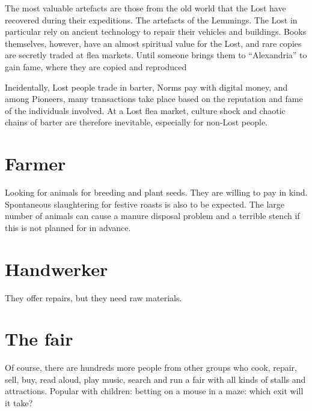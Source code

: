 The most valuable artefacts are those from the old world that the Lost have recovered during their expeditions. The artefacts of the Lemmings. The Lost in particular rely on ancient technology to repair their vehicles and buildings. Books themselves, however, have an almost spiritual value for the Lost, and rare copies are secretly traded at flea markets. Until someone brings them to “Alexandria” to gain fame, where they are copied and reproduced

Incidentally, Lost people trade in barter, Norms pay with digital money, and among Pioneers, many transactions take place based on the reputation and fame of the individuals involved. At a Lost flea market, culture shock and chaotic chains of barter are therefore inevitable, especially for non-Lost people.

\section{Farmer}

Looking for animals for breeding and plant seeds. They are willing to pay in kind. Spontaneous slaughtering for festive roasts is also to be expected. The large number of animals can cause a manure disposal problem and a terrible stench if this is not planned for in advance.

\section{Handwerker}

They offer repairs, but they need raw materials.

\section{The fair}

Of course, there are hundreds more people from other groups who cook, repair, sell, buy, read aloud, play music, search and run a fair with all kinds of stalls and attractions. Popular with children: betting on a mouse in a maze: which exit will it take?



